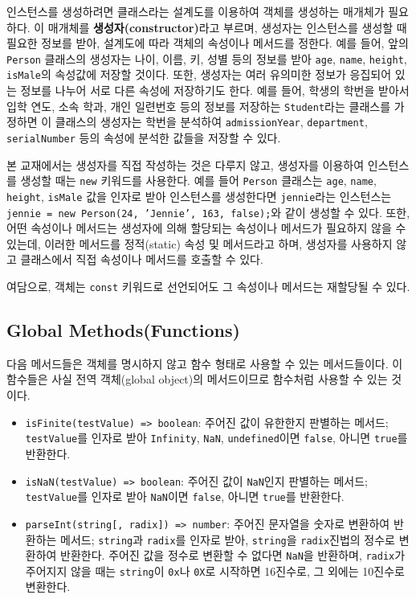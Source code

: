 인스턴스를 생성하려면 클래스라는 설계도를 이용하여 객체를 생성하는 매개체가 필요하다. 이 매개체를 \textbf{생성자(constructor)}라고 부르며, 생성자는 인스턴스를 생성할 때 필요한 정보를 받아, 설계도에 따라 객체의 속성이나 메서드를 정한다. 예를 들어, 앞의 \texttt{Person} 클래스의 생성자는 나이, 이름, 키, 성별 등의 정보를 받아 \texttt{age}, \texttt{name}, \texttt{height}, \texttt{isMale}의 속성값에 저장할 것이다. 또한, 생성자는 여러 유의미한 정보가 응집되어 있는 정보를 나누어 서로 다른 속성에 저장하기도 한다. 예를 들어, 학생의 학번을 받아서 입학 연도, 소속 학과, 개인 일련번호 등의 정보를 저장하는 \texttt{Student}라는 클래스를 가정하면 이 클래스의 생성자는 학번을 분석하여 \texttt{admissionYear}, \texttt{department}, \texttt{serialNumber} 등의 속성에 분석한 값들을 저장할 수 있다.

본 교재에서는 생성자를 직접 작성하는 것은 다루지 않고, 생성자를 이용하여 인스턴스를 생성할 때는 \texttt{new} 키워드를 사용한다. 예를 들어 \texttt{Person} 클래스는 \texttt{age}, \texttt{name}, \texttt{height}, \texttt{isMale} 값을 인자로 받아 인스턴스를 생성한다면 \texttt{jennie}라는 인스턴스는 \texttt{jennie = new Person(24, 'Jennie', 163, false);}와 같이 생성할 수 있다. 또한, 어떤 속성이나 메서드는 생성자에 의해 할당되는 속성이나 메서드가 필요하지 않을 수 있는데, 이러한 메서드를 정적(static) 속성 및 메서드라고 하며, 생성자를 사용하지 않고 클래스에서 직접 속성이나 메서드를 호출할 수 있다.

여담으로, 객체는 \texttt{const} 키워드로 선언되어도 그 속성이나 메서드는 재할당될 수 있다.

\subsection*{Global Methods(Functions)}

다음 메서드들은 객체를 명시하지 않고 함수 형태로 사용할 수 있는 메서드들이다. 이 함수들은 사실 전역 객체(global object)의 메서드이므로 함수처럼 사용할 수 있는 것이다.

\begin{itemize}
    \item \texttt{isFinite(testValue) => boolean}: 주어진 값이 유한한지 판별하는 메서드; \texttt{testValue}를 인자로 받아 \texttt{Infinity}, \texttt{NaN}, \texttt{undefined}이면 \texttt{false}, 아니면 \texttt{true}를 반환한다.
    \item \texttt{isNaN(testValue) => boolean}: 주어진 값이 \texttt{NaN}인지 판별하는 메서드; \texttt{testValue}를 인자로 받아 \texttt{NaN}이면 \texttt{false}, 아니면 \texttt{true}를 반환한다.
    \item \texttt{parseInt(string[, radix]) => number}: 주어진 문자열을 숫자로 변환하여 반환하는 메서드; \texttt{string}과 \texttt{radix}를 인자로 받아, \texttt{string}을 \texttt{radix}진법의 정수로 변환하여 반환한다. 주어진 값을 정수로 변환할 수 없다면 \texttt{NaN}을 반환하며, \texttt{radix}가 주어지지 않을 때는 \texttt{string}이 \texttt{0x}나 \texttt{0X}로 시작하면 16진수로, 그 외에는 10진수로 변환한다.
\end{itemize}


